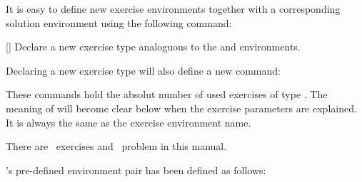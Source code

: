 \documentclass{xsim-manual}
\begin{document}
It is easy to define new exercise environments together with a corresponding
solution environment using the following command:
\begin{commands}
  []
    Declare a new exercise type analoguous to the  and
     environments.
\end{commands}
Declaring a new exercise type will also define a new command:
\begin{commands}
    These commands hold the absolut number of used exercises of type
    .  The meaning of  will become clear below
    when the exercise parameters are explained.  It is always the same as the
    exercise environment name.
\end{commands}
\begin{example}
  There are \numberofexercises~exercises and \numberofproblems~problem in this
  manual.
\end{example}
\xsim's pre-defined environment pair has been defined as
follows:
\begin{sourcecode}
\end{sourcecode}
\end{document}
